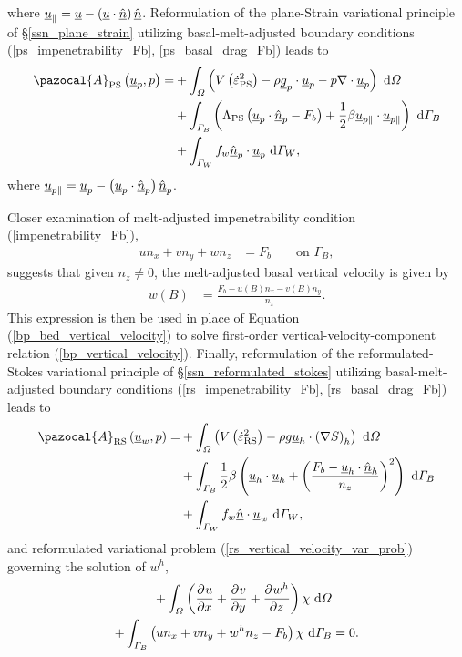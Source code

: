 where $\underline{u}_{\Vert} = \underline{u} - \left( \underline{u} \cdot \underline{\hat{n}} \right) \underline{\hat{n}}$.  Reformulation of the plane-Strain variational principle of \S \ref{ssn_plane_strain} utilizing basal-melt-adjusted boundary conditions (\ref{ps_impenetrability_Fb}, \ref{ps_basal_drag_Fb}) leads to
\begin{align}
  \label{ps_action_Fb}
  \pazocal{A}_{\text{PS}} \left(\rankone{u}_p, p\right) = &+ \int_{\Omega} \left( V\left( \dot{\varepsilon}_{\text{PS}}^2 \right) - \rho \rankone{g}_p \cdot \rankone{u}_p - p \nabla \cdot \rankone{u}_p \right) \d{\Omega} \notag \\
  &+ \int_{\Gamma_B} \left( \Lambda_{\text{PS}} \left( \rankone{u}_p \cdot \normal_p - F_b \right) + \frac{1}{2} \beta \rankone{u}_{p\Vert} \cdot \rankone{u}_{p\Vert} \right) \d{\Gamma_B} \notag \\
  &+ \int_{\Gamma_W} f_w \normal_p \cdot \rankone{u}_p \d{\Gamma_W},
\end{align}
where $\underline{u}_{p\Vert} = \underline{u}_p - \left( \underline{u}_p \cdot \underline{\hat{n}}_p \right) \underline{\hat{n}}_p$.

Closer examination of melt-adjusted impenetrability condition (\ref{impenetrability_Fb}),
\begin{align*}
  u n_x + v n_y + w n_z &= F_b  &&\text{ on } \Gamma_B,
\end{align*}
suggests that given $n_z \neq 0$, the melt-adjusted basal vertical velocity is given by
\begin{align}
  \label{bp_bed_vertical_velocity_Fb}
  w(B) &= \frac{F_b - u(B)n_x - v(B)n_y}{n_z}.
\end{align}
This expression is then be used in place of Equation (\ref{bp_bed_vertical_velocity}) to solve first-order vertical-velocity-component relation (\ref{bp_vertical_velocity}).  Finally, reformulation of the reformulated-Stokes variational principle of \S \ref{ssn_reformulated_stokes} utilizing basal-melt-adjusted boundary conditions (\ref{rs_impenetrability_Fb}, \ref{rs_basal_drag_Fb}) leads to
\begin{align}
  \label{rs_action_Fb}
  \pazocal{A}_{\text{RS}} \left(\rankone{u}_w, p\right) = &+ \int_{\Omega} \left( V\left( \dot{\varepsilon}_{\text{RS}}^2 \right) - \rho g \rankone{u}_h \cdot \left( \nabla S \right)_h \right) \d{\Omega} \notag \\
  &+ \int_{\Gamma_B} \frac{1}{2} \beta \left( \rankone{u}_h \cdot \rankone{u}_h + \left( \frac{F_b - \rankone{u}_h \cdot \normal_h}{n_z} \right)^2 \right) \d{\Gamma_B} \notag \\
  &+ \int_{\Gamma_W} f_w \normal \cdot \rankone{u}_w \d{\Gamma_W},
\end{align}
and reformulated variational problem (\ref{rs_vertical_velocity_var_prob}) governing the solution of $w^h$,
\begin{align}
  \label{rs_vertical_velocity_var_prob_Fb}
  + \int_{\varOmega} \left( \frac{\partial^{} u}{\partial x^{} } + \frac{\partial^{} v}{\partial y^{} } + \frac{\partial^{} w^h}{\partial z^{} } \right)\chi \ \mathrm{d}\varOmega & \\
  + \int_{\varGamma_B} \left( u n_x + v n_y + w^h n_z - F_b \right) \chi \ \mathrm{d}\varGamma_B &= 0.
\end{align}

